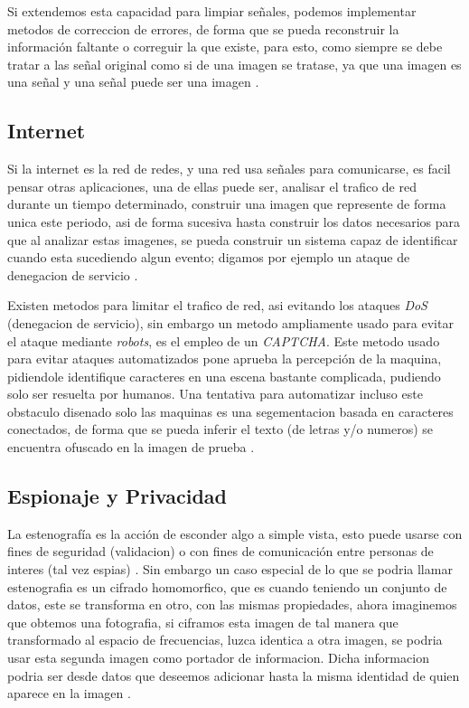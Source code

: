 \documentclass[a4paper]{IEEEtranUNT}
\begin{document}
Si extendemos esta capacidad para limpiar señales, podemos implementar metodos de correccion de errores, de forma que se pueda reconstruir la información faltante o correguir la que existe,  para esto, como siempre se debe tratar a las señal original como si de una imagen se tratase, ya que una imagen es una señal y una señal puede ser una imagen \citep{tian2020applying}.

\subsection{Internet}

Si la internet es la red de redes, y una red usa señales para comunicarse, es facil pensar otras aplicaciones, una de ellas puede ser, analisar el trafico de red durante un tiempo determinado, construir una imagen que represente de forma unica este periodo, asi de forma sucesiva hasta construir los datos necesarios para que al analizar estas imagenes, se pueda construir un sistema capaz de identificar cuando esta sucediendo algun evento; digamos por ejemplo un ataque de denegacion de servicio \cite{Tan2015}.

Existen metodos para limitar el trafico de red, asi evitando los ataques \textit{DoS} (denegacion de servicio), sin embargo un metodo ampliamente usado para evitar el ataque mediante \textit{robots}, es el empleo de un \textit{CAPTCHA}. Este metodo usado para evitar ataques automatizados pone aprueba la percepción de la maquina, pidiendole identifique caracteres en una escena bastante complicada, pudiendo solo ser resuelta por humanos. Una tentativa para automatizar incluso este obstaculo disenado solo las maquinas es una segementacion basada en caracteres conectados, de forma que se pueda inferir el texto (de letras y/o numeros) se encuentra ofuscado en la imagen de prueba \citep{Hussain2016}.

\subsection{Espionaje y Privacidad}

La estenografía es la acción de esconder algo a simple vista, esto puede usarse con fines de seguridad (validacion) o con fines de comunicación entre personas de interes (tal vez espias) \citep{Tran2002}. Sin embargo un caso especial de lo que se podria llamar estenografia es un cifrado homomorfico, que es cuando teniendo un conjunto de datos, este se transforma en otro, con las mismas propiedades, ahora imaginemos que obtemos una fotografia, si ciframos esta imagen de tal manera que transformado al espacio de frecuencias, luzca identica a otra imagen, se podria usar esta segunda imagen como portador de informacion. Dicha informacion podria ser desde datos que deseemos adicionar hasta la misma identidad de quien aparece en la imagen \citep{bian2020ensei}.
\end{document}
